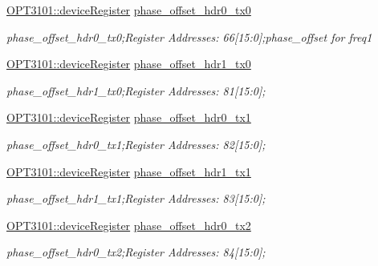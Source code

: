 \begin{DoxyCompactItemize}
\mbox{\hyperlink{class_o_p_t3101_1_1device_register}{O\+P\+T3101\+::device\+Register}} \mbox{\hyperlink{class_o_p_t3101_1_1registers_af079839b4c86061e23aeec6d3dd1727b}{phase\+\_\+offset\+\_\+hdr0\+\_\+tx0}}
\begin{DoxyCompactList}\small\item\em phase\+\_\+offset\+\_\+hdr0\+\_\+tx0;Register Addresses\+: 66\mbox{[}15\+:0\mbox{]};phase\+\_\+offset for freq1 \end{DoxyCompactList}\item 
\mbox{\hyperlink{class_o_p_t3101_1_1device_register}{O\+P\+T3101\+::device\+Register}} \mbox{\hyperlink{class_o_p_t3101_1_1registers_aa8cb1dd2f5eff88842c6adbcb51f529a}{phase\+\_\+offset\+\_\+hdr1\+\_\+tx0}}
\begin{DoxyCompactList}\small\item\em phase\+\_\+offset\+\_\+hdr1\+\_\+tx0;Register Addresses\+: 81\mbox{[}15\+:0\mbox{]}; \end{DoxyCompactList}\item 
\mbox{\hyperlink{class_o_p_t3101_1_1device_register}{O\+P\+T3101\+::device\+Register}} \mbox{\hyperlink{class_o_p_t3101_1_1registers_a4097670bfd34c50f64b7644626bb3390}{phase\+\_\+offset\+\_\+hdr0\+\_\+tx1}}
\begin{DoxyCompactList}\small\item\em phase\+\_\+offset\+\_\+hdr0\+\_\+tx1;Register Addresses\+: 82\mbox{[}15\+:0\mbox{]}; \end{DoxyCompactList}\item 
\mbox{\hyperlink{class_o_p_t3101_1_1device_register}{O\+P\+T3101\+::device\+Register}} \mbox{\hyperlink{class_o_p_t3101_1_1registers_ab8e2d3debdf4530c6e5fe8067bce8d96}{phase\+\_\+offset\+\_\+hdr1\+\_\+tx1}}
\begin{DoxyCompactList}\small\item\em phase\+\_\+offset\+\_\+hdr1\+\_\+tx1;Register Addresses\+: 83\mbox{[}15\+:0\mbox{]}; \end{DoxyCompactList}\item 
\mbox{\hyperlink{class_o_p_t3101_1_1device_register}{O\+P\+T3101\+::device\+Register}} \mbox{\hyperlink{class_o_p_t3101_1_1registers_a0d0a60da10be596de1ef5b9d69e14812}{phase\+\_\+offset\+\_\+hdr0\+\_\+tx2}}
\begin{DoxyCompactList}\small\item\em phase\+\_\+offset\+\_\+hdr0\+\_\+tx2;Register Addresses\+: 84\mbox{[}15\+:0\mbox{]}; \end{DoxyCompactList}\item 

\end{DoxyCompactItemize}
